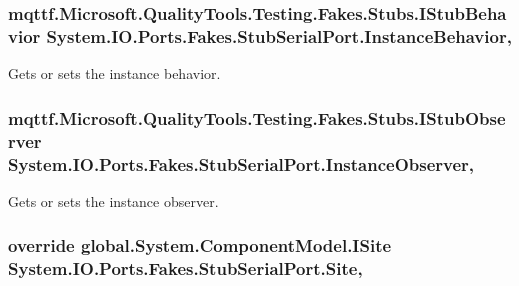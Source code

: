 \hypertarget{class_system_1_1_i_o_1_1_ports_1_1_fakes_1_1_stub_serial_port_a4fb0d0906ac3165ce6d0f083e67e4caa}{
\subsubsection[{Instance\-Behavior}]{\setlength{\rightskip}{0pt plus 5cm}mqttf.\-Microsoft.\-Quality\-Tools.\-Testing.\-Fakes.\-Stubs.\-I\-Stub\-Behavior System.\-I\-O.\-Ports.\-Fakes.\-Stub\-Serial\-Port.\-Instance\-Behavior\hspace{0.3cm}{\ttfamily [get]}, {\ttfamily [set]}}}\label{class_system_1_1_i_o_1_1_ports_1_1_fakes_1_1_stub_serial_port_a4fb0d0906ac3165ce6d0f083e67e4caa}


Gets or sets the instance behavior.

\hypertarget{class_system_1_1_i_o_1_1_ports_1_1_fakes_1_1_stub_serial_port_ae187a1d390d68a951eda8107a839aa46}{
\subsubsection[{Instance\-Observer}]{\setlength{\rightskip}{0pt plus 5cm}mqttf.\-Microsoft.\-Quality\-Tools.\-Testing.\-Fakes.\-Stubs.\-I\-Stub\-Observer System.\-I\-O.\-Ports.\-Fakes.\-Stub\-Serial\-Port.\-Instance\-Observer\hspace{0.3cm}{\ttfamily [get]}, {\ttfamily [set]}}}\label{class_system_1_1_i_o_1_1_ports_1_1_fakes_1_1_stub_serial_port_ae187a1d390d68a951eda8107a839aa46}


Gets or sets the instance observer.

\hypertarget{class_system_1_1_i_o_1_1_ports_1_1_fakes_1_1_stub_serial_port_af6d38ab4eb141a7951e40d3d9ac03156}{
\subsubsection[{Site}]{\setlength{\rightskip}{0pt plus 5cm}override global.\-System.\-Component\-Model.\-I\-Site System.\-I\-O.\-Ports.\-Fakes.\-Stub\-Serial\-Port.\-Site\hspace{0.3cm}{\ttfamily [get]}, {\ttfamily [set]}}}\label{class_system_1_1_i_o_1_1_ports_1_1_fakes_1_1_stub_serial_port_af6d38ab4eb141a7951e40d3d9ac03156}


